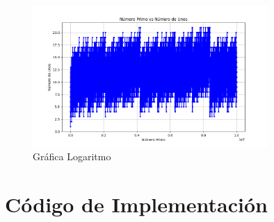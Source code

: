 \documentclass[11pt]{article} %
\begin{document}
	\begin{figure}[H]
		\centering
		\includegraphics[width=0.8\textwidth]{imagen4.png}
		\caption{Gráfica Logaritmo}
	\end{figure}
	
	
	\section{Código de Implementación}
	
\end{document}
